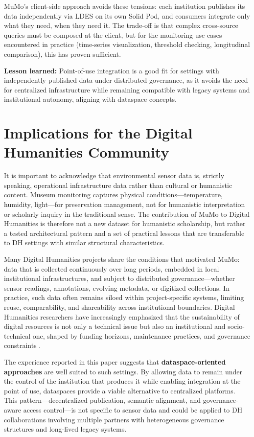 \documentclass{ceurart}
\begin{document}
MuMo's client-side approach avoids these tensions: each institution
publishes its data independently via LDES on its own Solid Pod, and
consumers integrate only what they need, when they need it. The
trade-off is that complex cross-source queries must be composed at the
client, but for the monitoring use cases encountered in practice
(time-series visualization, threshold checking, longitudinal
comparison), this has proven sufficient.

\textbf{Lesson learned:} Point-of-use integration is a good fit for
settings with independently published data under distributed governance,
as it avoids the need for centralized infrastructure while remaining
compatible with legacy systems and institutional autonomy, aligning with
dataspace concepts.

\section{Implications for the Digital Humanities
Community}\label{sec:impact}

It is important to acknowledge that environmental sensor data is,
strictly speaking, operational infrastructure data rather than cultural
or humanistic content. Museum monitoring captures physical
conditions---temperature, humidity, light---for preservation management,
not for humanistic interpretation or scholarly inquiry in the
traditional sense. The contribution of MuMo to Digital Humanities is
therefore not a new dataset for humanistic scholarship, but rather a
tested architectural pattern and a set of practical lessons that are
transferable to DH settings with similar structural characteristics.

Many Digital Humanities projects share the conditions that motivated
MuMo: data that is collected continuously over long periods, embedded in
local institutional infrastructures, and subject to distributed
governance---whether sensor readings, annotations, evolving metadata, or
digitized collections. In practice, such data often remains siloed
within project-specific systems, limiting reuse, comparability, and
shareability across institutional boundaries. Digital Humanities
researchers have increasingly emphasized that the sustainability of
digital resources is not only a technical issue but also an
institutional and socio-technical one, shaped by funding horizons,
maintenance practices, and governance constraints
\citep{tucker2022facing, fenlon2020sustaining}.

The experience reported in this paper suggests that
\textbf{dataspace-oriented approaches} are well suited to such settings.
By allowing data to remain under the control of the institution that
produces it while enabling integration at the point of use, dataspaces
provide a viable alternative to centralized platforms. This
pattern---decentralized publication, semantic alignment, and
governance-aware access control---is not specific to sensor data and
could be applied to DH collaborations involving multiple partners with
heterogeneous governance structures and long-lived legacy systems.
\end{document}
